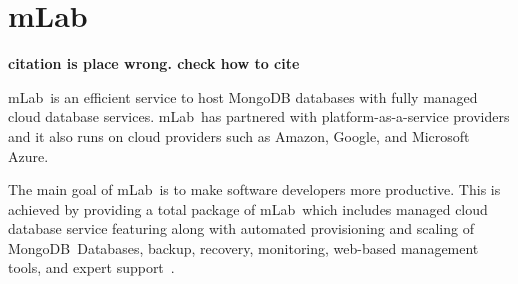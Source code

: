 \section{mLab}

{\bf citation is place wrong. check how to cite}

mLab\ is an efficient service to host MongoDB databases with fully
managed cloud database services. mLab\ has partnered with
platform-as-a-service providers and it also runs on cloud providers
such as Amazon, Google, and Microsoft Azure.

The main goal of mLab\ is to make software developers more productive.
This is achieved by providing a total package of mLab\ which includes
managed cloud database service featuring along with automated
provisioning and scaling of MongoDB\ Databases, backup, recovery,
monitoring, web-based management tools, and expert
support~\cite{hid-sp18-406-mLab}.
